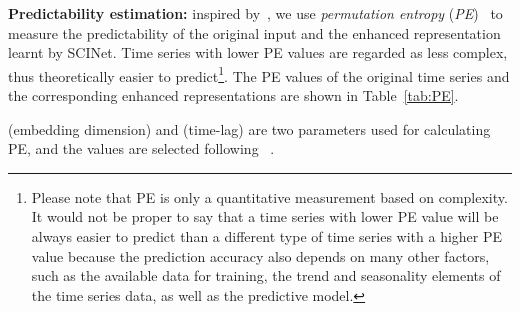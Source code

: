 \documentclass{article}
\begin{document}
\vspace{3pt}
\textbf{Predictability estimation:} inspired by~\citep{Huang2019EnhancedTS,Pennekamp2019TheIP}, we use \textit{permutation entropy} (\textit{PE})~\citep{Bandt2002PermutationEA} to measure the predictability of the original input and the enhanced representation learnt by SCINet. Time series with lower PE values are regarded as less complex, thus theoretically easier to predict\footnote{Please note that PE is only a quantitative measurement based on complexity. It would not be proper to say that a time series with lower PE value will be always easier to predict than a different type of time series with a higher PE value because the prediction accuracy also depends on many other factors, such as the available data for training, the trend and seasonality elements of the time series data, as well as the predictive model.}. The PE values of the original time series and the corresponding enhanced representations are shown in Table~\ref{tab:PE}.  

\begin{table*}[h]
\caption{Permutation entropy comparison before and after SCINet.}
\begin{threeparttable}
\begin{tablenotes} \tiny
		\item    (embedding dimension) and  (time-lag) are two parameters used for calculating PE, and the values are selected following ~\citep{Pennekamp2019TheIP,Huang2019EnhancedTS}.
     \end{tablenotes} 

\end{threeparttable} \label{tab:PE}
\end{table*}
\end{document}
